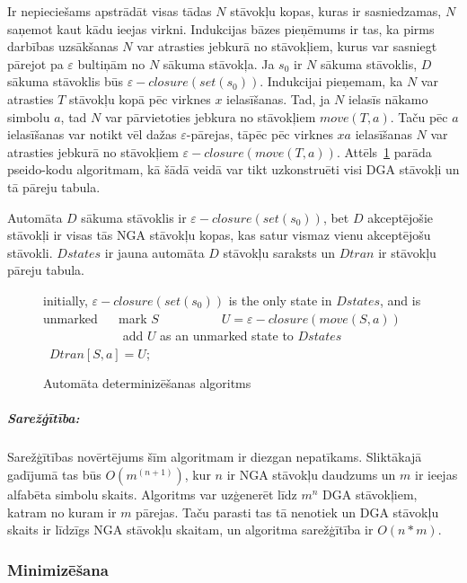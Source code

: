 Ir nepieciešams apstrādāt visas tādas $N$ stāvokļu kopas, kuras ir sasniedzamas, $N$ saņemot kaut kādu ieejas virkni. Indukcijas bāzes pieņēmums ir tas, ka pirms darbības uzsākšanas $N$ var atrasties jebkurā no stāvokļiem, kurus var sasniegt pārejot pa $\varepsilon$ bultiņām no $N$ sākuma stāvokļa. Ja $s_0$ ir $N$ sākuma stāvoklis, $D$ sākuma stāvoklis būs $\varepsilon-closure (set (s_0))$. Indukcijai pieņemam, ka $N$ var atrasties $T$ stāvokļu kopā pēc virknes $x$ ielasīšanas. Tad, ja $N$ ielasīs nākamo simbolu $a$, tad $N$ var pārvietoties jebkura no stāvokļiem $move (T, a)$. Taču pēc $a$ ielasīšanas var notikt vēl dažas $\varepsilon$-pārejas, tāpēc pēc virknes $xa$ ielasīšanas $N$ var atrasties jebkurā no stāvokļiem $\varepsilon-closure (move (T, a))$. Attēls~\ref{fig:det_algorithm} parāda pseido-kodu algoritmam, kā šādā veidā var tikt uzkonstruēti visi DGA stāvokļi un tā pāreju tabula.

Automāta $D$ sākuma stāvoklis ir $\varepsilon-closure (set (s_0))$, bet $D$ akceptējošie stāvokļi ir visas tās NGA stāvokļu kopas, kas satur vismaz vienu akceptējošu stāvokli. $Dstates$ ir jauna automāta $D$ stāvokļu saraksts un $Dtran$ ir stāvokļu pāreju tabula.

\begin{figure}[h]
  \begin{algorithmic}
  \State initially, $\varepsilon-closure (set (s_0))$  is the only state in $Dstates$, and is unmarked
      \State mark $S$
          \State $U = \varepsilon-closure (move (S, a))$
              \State add $U$ as an unmarked state to $Dstates$
          \EndIf
          \State $Dtran [S, a] = U$;
      \EndFor
  \EndWhile
  \end{algorithmic}
  \caption{\label{fig:det_algorithm}Automāta determinizēšanas algoritms}
\end{figure}

\subparagraph{Sarežģītība:} Sarežģītības novērtējums šīm algoritmam ir diezgan nepatīkams. Sliktākajā gadījumā tas būs $O(m^(n+1))$, kur $n$ ir NGA stāvokļu daudzums un $m$ ir ieejas alfabēta simbolu skaits. Algoritms var uzģenerēt līdz $m^n$ DGA stāvokļiem, katram no kuram ir $m$ pārejas. Taču parasti tas tā nenotiek un DGA stāvokļu skaits ir līdzīgs NGA stāvokļu skaitam, un algoritma sarežģītība ir $O(n*m)$. \cite{DragonBook, Hopcroft:IntroAutomataTheory}

\subsubsection{\label{sbsbs:sol_minimization}Minimizēšana}

